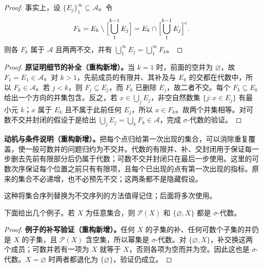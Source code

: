 \documentclass[../../main.tex]{subfiles}%
\begin{document}
\begin{proof}
事实上，设 $\{E_j\}_1^\infty\subseteq\mathscr{A}$。令
\begin{align*}
F_k=E_k\setminus\Bigl[\bigcup_1^{k-1}E_j\Bigr]
=E_k\cap\Bigl[\bigcup_1^{k-1}E_j\Bigr]^{\mathrm{c}}.
\end{align*}
则各 $F_k$ 属于 $\mathscr{A}$ 且两两不交，并有 $\bigcup_1^\infty E_j=\bigcup_1^\infty F_k$。
\end{proof}
\begin{proof}
\textbf{原证明细节的补全（重构新增）。}当 $k=1$ 时，前面的空并为 $\varnothing$，故 $F_1=E_1\in\mathscr{A}$。对 $k>1$，先前成员的有限并、其补及与 $E_k$ 的交都在代数中，所以 $F_k\in\mathscr{A}$。若 $j<k$，则 $F_j\subseteq E_j$，而 $F_k$ 已删除 $E_j$，故二者不交。每个 $F_k\subseteq E_k$ 给出一个方向的并集包含。反之，若 $x\in\bigcup_jE_j$，非空自然数集 $\{j:x\in E_j\}$ 有最小元 $k$；$x$ 属于 $E_k$ 且不属于此前任何 $E_j$，所以 $x\in F_k$。故两个并集相等。对可数不交并封闭的假设于是给出 $\bigcup_jE_j=\bigcup_kF_k\in\mathscr{A}$，完成 $\sigma$-代数的验证。
\end{proof}
\begin{remark}
\textbf{动机与条件说明（重构新增）。}把每个点归给第一次出现的集合，可以消除重复覆盖，使一般可数并的问题归约为不交并。代数的有限并、补、交封闭用于保证每一步删去先前有限部分后仍属于代数；可数不交并封闭只在最后一步使用。这里的可数次序保证每个位置之前只有有限项，且每个已出现的点有第一次出现的指标。原来的集合不必递增，也不必预先不交；这两条都不是隐藏假设。
\end{remark}


\begin{remark}
这种将集合序列替换为不交序列的方法值得记住；后面将多次使用。
\end{remark}



\begin{examples}\label{examples:ch01-sigma-algebra-examples}
下面给出几个例子。若 $X$ 为任意集合，则 $\mathscr{P}(X)$ 和 $\{\varnothing,X\}$ 都是 $\sigma$-代数。
\end{examples}
\begin{proof}
\textbf{例子的补写验证（重构新增）。}任何 $X$ 的子集的补、任何可数个子集的并仍是 $X$ 的子集，且 $\mathscr{P}(X)$ 含空集，所以幂集是 $\sigma$-代数。对 $\{\varnothing,X\}$，补交换这两个成员；可数并若有一项为 $X$ 就等于 $X$，否则各项为空而并为空。因此这也是 $\sigma$-代数。$X=\varnothing$ 时两者都退化为 $\{\varnothing\}$，验证仍成立。
\end{proof}
\end{document}

